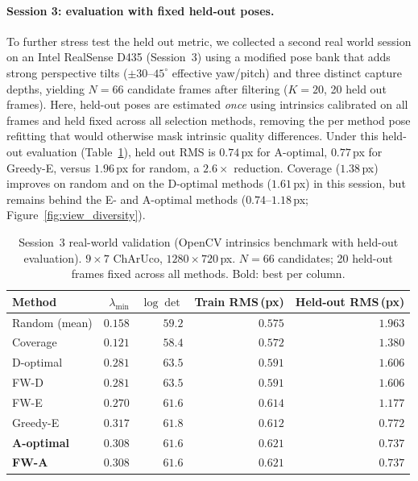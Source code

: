 \documentclass[letterpaper, 9
 pt, conference]{ieeeconf}
\begin{document}
\paragraph{Session 3: evaluation with fixed held-out poses.}
To further stress test the held out metric, we collected a second real world
session on an Intel RealSense D435 (Session~3) using a modified pose bank that adds strong perspective
tilts ($\pm30$--$45^\circ$ effective yaw/pitch) and three distinct capture
depths, yielding $N{=}66$ candidate frames after filtering ($K{=}20$,
20 held out frames).
Here, held-out poses are estimated \emph{once} using intrinsics calibrated
on all frames and held fixed across all selection methods, removing the
per method pose refitting that would otherwise mask intrinsic
quality differences.
Under this held-out evaluation (Table~\ref{tab:real_world_session3}),
held out RMS is
$0.74$\,px for A-optimal, $0.77$\,px for Greedy-E, versus
$1.96$\,px for random, a $2.6\times$ reduction.
Coverage ($1.38$\,px) improves on random and on the D-optimal methods
($1.61$\,px) in this session, but remains behind the E- and A-optimal
methods ($0.74$--$1.18$\,px; Figure~\ref{fig:view_diversity}).

\begin{table}[ht]
\centering
\caption{Session~3 real-world validation (OpenCV intrinsics benchmark with held-out evaluation).
$9{\times}7$ ChArUco, $1280{\times}720$\,px.
$N{=}66$ candidates; 20 held-out frames fixed across all methods.
Bold: best per column.}
\label{tab:real_world_session3}
\scriptsize
\setlength{\tabcolsep}{5pt}
\begin{tabular}{lrrrr}
\toprule
Method & $\lambda_{\min}$ & $\log\det$ & Train RMS\,(px) & Held-out RMS\,(px) \\
\midrule
Random (mean)      & $0.158$ & $59.2$ & $0.575$ & $1.963$ \\
Coverage           & $0.121$ & $58.4$ & $0.572$ & $1.380$ \\
D-optimal          & $0.281$ & $\mathbf{63.5}$ & $0.591$ & $1.606$ \\
FW-D               & $0.281$ & $\mathbf{63.5}$ & $0.591$ & $1.606$ \\
FW-E               & $0.270$ & $61.6$ & $0.614$ & $1.177$ \\
Greedy-E           & $\mathbf{0.317}$ & $61.8$ & $0.612$ & $0.772$ \\
\textbf{A-optimal} & $0.308$ & $61.6$ & $0.621$ & $\mathbf{0.737}$ \\
\textbf{FW-A}      & $0.308$ & $61.6$ & $0.621$ & $\mathbf{0.737}$ \\
\bottomrule
\end{tabular}
\end{table}
\end{document}
